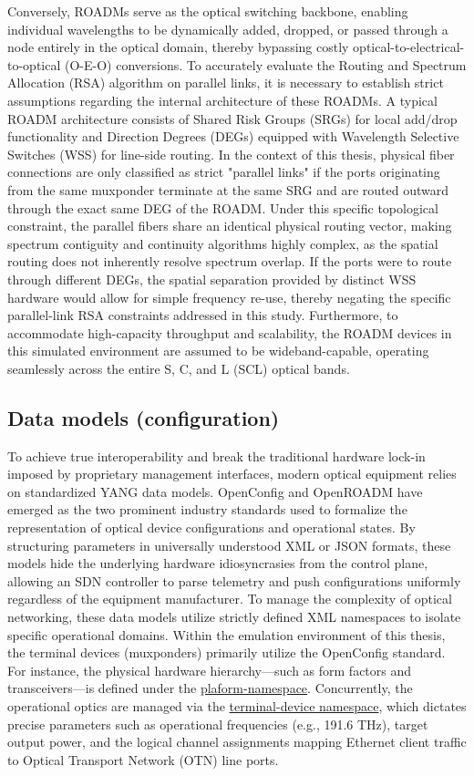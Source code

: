 Conversely, ROADMs serve as the optical switching backbone, enabling individual wavelengths to be dynamically added, dropped, or passed through a node entirely in the optical domain, thereby bypassing costly optical-to-electrical-to-optical (O-E-O) conversions. To accurately evaluate the Routing and Spectrum Allocation (RSA) algorithm on parallel links, it is necessary to establish strict assumptions regarding the internal architecture of these ROADMs. A typical ROADM architecture consists of Shared Risk Groups (SRGs) for local add/drop functionality and Direction Degrees (DEGs) equipped with Wavelength Selective Switches (WSS) for line-side routing. In the context of this thesis, physical fiber connections are only classified as strict "parallel links" if the ports originating from the same muxponder terminate at the same SRG and are routed outward through the exact same DEG of the ROADM. Under this specific topological constraint, the parallel fibers share an identical physical routing vector, making spectrum contiguity and continuity algorithms highly complex, as the spatial routing does not inherently resolve spectrum overlap. If the ports were to route through different DEGs, the spatial separation provided by distinct WSS hardware would allow for simple frequency re-use, thereby negating the specific parallel-link RSA constraints addressed in this study. Furthermore, to accommodate high-capacity throughput and scalability, the ROADM devices in this simulated environment are assumed to be wideband-capable, operating seamlessly across the entire S, C, and L (SCL) optical bands.
\subsection{Data models (configuration)}
To achieve true interoperability and break the traditional hardware lock-in imposed by proprietary management interfaces, modern optical equipment relies on standardized YANG data models. OpenConfig\cite{openconfigYang} and OpenROADM\cite{openroadmYang} have emerged as the two prominent industry standards used to formalize the representation of optical device configurations and operational states. By structuring parameters in universally understood XML or JSON formats, these models hide the underlying hardware idiosyncrasies from the control plane, allowing an SDN controller to parse telemetry and push configurations uniformly regardless of the equipment manufacturer. To manage the complexity of optical networking, these data models utilize strictly defined XML namespaces to isolate specific operational domains. Within the emulation environment of this thesis, the terminal devices (muxponders) primarily utilize the OpenConfig standard. For instance, the physical hardware hierarchy—such as form factors and transceivers—is defined under the \href{http://openconfig.net/yang/platform}{plaform-namespace}. Concurrently, the operational optics are managed via the \href{http://openconfig.net/yang/terminal-device}{terminal-device namespace}, which dictates precise parameters such as operational frequencies (e.g., 191.6 THz), target output power, and the logical channel assignments mapping Ethernet client traffic to Optical Transport Network (OTN) line ports.

